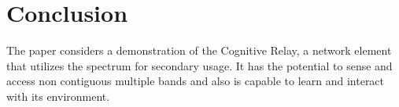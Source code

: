 \documentclass[conference,a4paper]{IEEEtran}
\begin{document}
\section{Conclusion} \label{sec:conc}
The paper considers a demonstration of the Cognitive Relay, a network element
that utilizes the spectrum for secondary usage. It has the potential to sense
and access non contiguous multiple bands and also is capable to learn and
interact with its environment.
\end{document}
